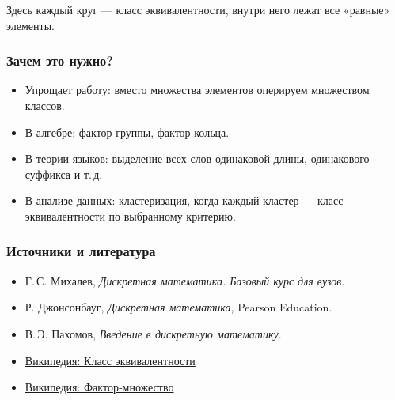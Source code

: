 Здесь каждый круг — класс эквивалентности, внутри него лежат все «равные» элементы.

\subsubsection{Зачем это нужно?}

\begin{itemize}[leftmargin=*]
  \item Упрощает работу: вместо множества элементов оперируем множеством классов.
  \item В алгебре: фактор‑группы, фактор‑кольца.
  \item В теории языков: выделение всех слов одинаковой длины, одинакового суффикса и т.\,д.
  \item В анализе данных: кластеризация, когда каждый кластер — класс эквивалентности по выбранному критерию.
\end{itemize}

\subsubsection{Источники и литература}

\begin{itemize}
  \item Г.\,С. Михалев, \emph{Дискретная математика. Базовый курс для вузов}.
  \item Р. Джонсонбауг, \emph{Дискретная математика}, Pearson Education.
  \item В.\,Э. Пахомов, \emph{Введение в дискретную математику}.
  \item \href{https://ru.wikipedia.org/wiki/Класс_эквивалентности}{Википедия: Класс эквивалентности}
  \item \href{https://ru.wikipedia.org/wiki/Фактор-множество}{Википедия: Фактор‑множество}
\end{itemize}